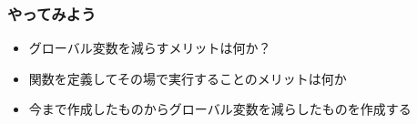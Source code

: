 \begin{frame}[containsverbatim]
 \frametitle{やってみよう}
 \begin{itemize}
	\item グローバル変数を減らすメリットは何か？
	\item 関数を定義してその場で実行することのメリットは何か
	\item 今まで作成したものからグローバル変数を減らしたものを作成する
 \end{itemize}
\end{frame}


\begin{frame}[containsverbatim]
 \frametitle{}
\end{frame}
